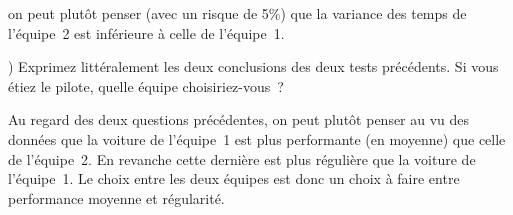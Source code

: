 \documentclass[10pt]{report}
\begin{document}
\begin{exercice}
\begin{Correction}
on peut plutôt penser (avec un risque de 5\%) que la variance des temps de l'équipe~2 est inférieure à celle de l'équipe~1.
\end{Correction}


) Exprimez littéralement les deux conclusions des deux tests précédents. Si vous étiez le pilote, quelle équipe choisiriez-vous~?


\begin{Correction}
Au regard des deux questions précédentes, on peut plutôt penser au vu des données que la voiture de l'équipe~1 est plus performante (en moyenne) que celle de l'équipe~2. En revanche cette dernière est plus régulière que la voiture de l'équipe~1. Le choix entre les deux équipes est donc un choix à faire entre performance moyenne et régularité. 
\end{Correction}


\end{exercice}
\end{document}

